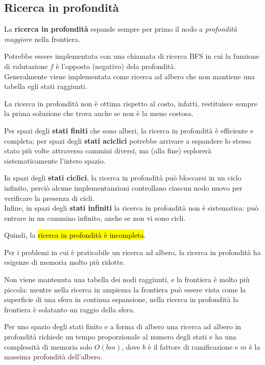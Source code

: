 \documentclass[12pt, a4paper, oneside]{book}
\begin{document}
    \subsection{Ricerca in profondità}
    La \textbf{ricerca in profondità} espande sempre per primo il nodo a \textit{profondità maggiore} nella frontiera.

    Potrebbe essere implementata con una chiamata di ricerca BFS in cui la funzione di valutazione $f$ è l'opposto (negativo) dela profondità. \\[0.2ex]
    Generalmente viene implementata come ricerca ad albero che non mantiene una tabella egli stati raggiunti.

    La ricerca in profondità non è ottima rispetto al costo, infatti, restituisce sempre la prima soluzione che trova anche se non è la meno costosa.
    
    Per spazi degli \textbf{stati finiti} che sono alberi, la ricerca in profondità è efficiente e completa; per spazi degli \textbf{stati aciclici} potrebbe arrivare a espandere lo stesso stato più volte attraverso cammini diversi, ma (alla fine) esplorerà sistematicamente l'intero spazio.


    In spazi degli \textbf{stati ciclici}, la ricerca in profondità può bloccarsi in un ciclo infinito, perciò alcune implementanzioni controllano ciascun nodo nuovo per verificare la presenza di cicli. \\[0.2ex]
    Infine, in spazi degli \textbf{stati infiniti} la ricerca in profondità non è sistematica: può entrare in un cammino infinito, anche se non vi sono cicli.

    Quindi, la \hl{ricerca in profondità è incompleta}.

    Per i problemi in cui è praticabile un ricerca ad albero, la ricerca in profondità ha esigenze di memoria molto più ridotte.

    Non viene mantenuta una tabella dei nodi raggiunti, e la frontiera è molto più piccola: mentre nella ricerca in ampiezza la frontiera può essere vista come la superficie di una sfera in continua espansione, nella ricerca in profondità la frontiera è solatanto un raggio della sfera.

    Per uno spazio degli stati finito e a forma di albero una ricerca ad albero in profondità richiede un tempo proporzionale al numero degli stati e ha una complessità di memoria solo $O(bm)$, dove $b$ è il fattore di ramificazione e $m$ è la massima profondità dell'albero.
\end{document}

